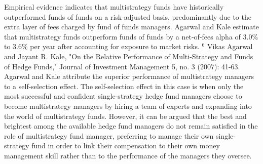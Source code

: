 \documentclass[11pt]{article}
\begin{document}
Empirical evidence indicates that multistrategy funds have historically outperformed funds of funds on a risk-adjusted basis, predominantly due to the extra layer of fees charged by fund of funds managers. Agarwal and Kale estimate that multistrategy funds outperform funds of funds by a net-of-fees alpha of $3.0 \%$ to $3.6 \%$ per year after accounting for exposure to market risks. ${ }^{6}$ Vikas Agarwal and Jayant R. Kale, "On the Relative Performance of Multi-Strategy and Funds of Hedge Funds," Journal of Investment Management 5, no. 3 (2007): 41-63. Agarwal and Kale attribute the superior performance of multistrategy managers to a self-selection effect. The self-selection effect in this case is when only the most successful and confident single-strategy hedge fund managers choose to become multistrategy managers by hiring a team of experts and expanding into the world of multistrategy funds. However, it can be argued that the best and brightest among the available hedge fund managers do not remain satisfied in the role of multistrategy fund manager, preferring to manage their own single-strategy fund in order to link their compensation to their own money management skill rather than to the performance of the managers they oversee.
\end{document}

